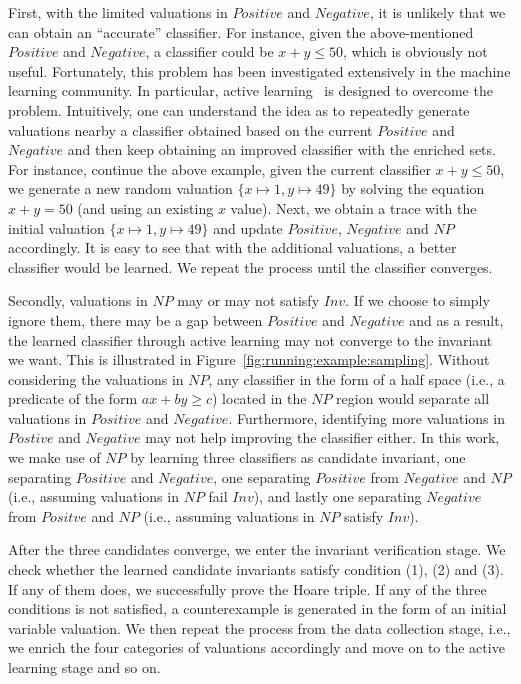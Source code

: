 First, with the limited valuations in $Positive$ and $Negative$, it is unlikely that we can obtain an ``accurate'' classifier. For instance, given the above-mentioned $Positive$ and $Negative$, a classifier could be $x+y \leq 50$, which is obviously not useful. Fortunately, this problem has been investigated extensively in the machine learning community. In particular, active learning~\cite{} is designed to overcome the problem. Intuitively, one can understand the idea as to repeatedly generate valuations nearby a classifier obtained based on the current $Positive$ and $Negative$ and then keep obtaining an improved classifier with the enriched sets. For instance, continue the above example, given the current classifier $x+y \leq 50$, we generate a new random valuation $\{x \mapsto 1, y \mapsto 49\}$ by solving the equation $x+y=50$ (and using an existing $x$ value). Next, we obtain a trace with the initial valuation $\{x \mapsto 1, y \mapsto 49\}$ and update $Positive$, $Negative$ and $NP$ accordingly. It is easy to see that with the additional valuations, a better classifier would be learned. We repeat the process until the classifier converges. 

Secondly, valuations in $NP$ may or may not satisfy $Inv$. If we choose to simply ignore them, there may be a gap between $Positive$ and $Negative$ and as a result, the learned classifier through active learning may not converge to the invariant we want. This is illustrated in Figure~\ref{fig:running:example:sampling}. Without considering the valuations in $NP$, any classifier in the form of a half space (i.e., a predicate of the form $ax + by \geq c$) located in the $NP$ region would separate all valuations in $Positive$ and $Negative$. Furthermore, identifying more valuations in $Postive$ and $Negative$ may not help improving the classifier either. In this work, we make use of $NP$ by learning three classifiers as candidate invariant, one separating $Positive$ and $Negative$, one separating $Positive$ from $Negative$ and $NP$ (i.e., assuming valuations in $NP$ fail $Inv$), and lastly one separating $Negative$ from $Positve$ and $NP$ (i.e., assuming valuations in $NP$ satisfy $Inv$). 

After the three candidates converge, we enter the invariant verification stage. We check whether the learned candidate invariants satisfy condition (1), (2) and (3). If any of them does, we successfully prove the Hoare triple. If any of the three conditions is not satisfied, a counterexample is generated in the form of an initial variable valuation. We then repeat the process from the data collection stage, i.e., we enrich the four categories of valuations accordingly and move on to the active learning stage and so on. 

